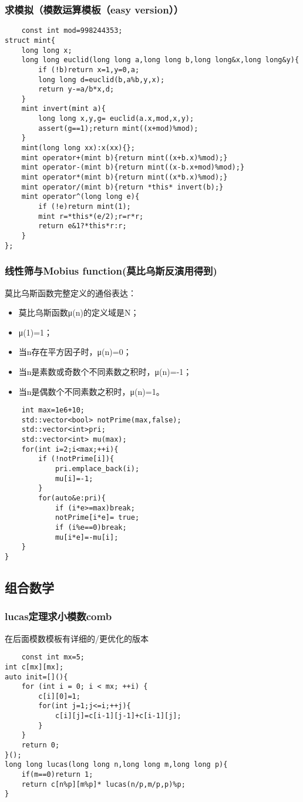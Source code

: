 \documentclass[UTF8]{ctexart}
\begin{document}
\subsubsection{求模拟（模数运算模板（easy version））}
\begin{lstlisting}
    const int mod=998244353;
struct mint{
    long long x;
    long long euclid(long long a,long long b,long long&x,long long&y){
        if (!b)return x=1,y=0,a;
        long long d=euclid(b,a%b,y,x);
        return y-=a/b*x,d;
    }
    mint invert(mint a){
        long long x,y,g= euclid(a.x,mod,x,y);
        assert(g==1);return mint((x+mod)%mod);
    }
    mint(long long xx):x(xx){};
    mint operator+(mint b){return mint((x+b.x)%mod);}
    mint operator-(mint b){return mint((x-b.x+mod)%mod);}
    mint operator*(mint b){return mint((x*b.x)%mod);}
    mint operator/(mint b){return *this* invert(b);}
    mint operator^(long long e){
        if (!e)return mint(1);
        mint r=*this*(e/2);r=r*r;
        return e&1?*this*r:r;
    }
};
\end{lstlisting}
\subsubsection{线性筛与Mobius function(莫比乌斯反演用得到)}
莫比乌斯函数完整定义的通俗表达：
\begin{itemize}
    \item 莫比乌斯函数μ(n)的定义域是N；
    \item μ(1)=1；
    \item 当n存在平方因子时，μ(n)=0；
    \item 当n是素数或奇数个不同素数之积时，μ(n)=-1；
    \item 当n是偶数个不同素数之积时，μ(n)=1。
\end{itemize}
\begin{lstlisting}
    int max=1e6+10;
    std::vector<bool> notPrime(max,false);
    std::vector<int>pri;
    std::vector<int> mu(max);
    for(int i=2;i<max;++i){
        if (!notPrime[i]){
            pri.emplace_back(i);
            mu[i]=-1;
        }
        for(auto&e:pri){
            if (i*e>=max)break;
            notPrime[i*e]= true;
            if (i%e==0)break;
            mu[i*e]=-mu[i];
    }
}
\end{lstlisting}
\subsection{组合数学}
\subsubsection{lucas定理求小模数comb}
在后面模数模板有详细的/更优化的版本
\begin{lstlisting}
    const int mx=5;
int c[mx][mx];
auto init=[](){
    for (int i = 0; i < mx; ++i) {
        c[i][0]=1;
        for(int j=1;j<=i;++j){
            c[i][j]=c[i-1][j-1]+c[i-1][j];
        }
    }
    return 0;
}();
long long lucas(long long n,long long m,long long p){
    if(m==0)return 1;
    return c[n%p][m%p]* lucas(n/p,m/p,p)%p;
}
\end{lstlisting}
\end{document}
